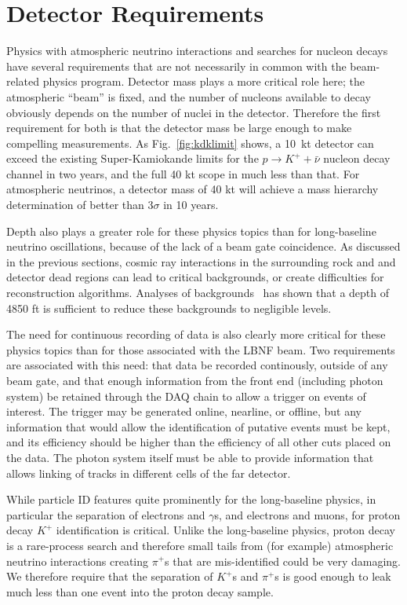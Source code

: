 \section{Detector Requirements}
\label{sec:physics-atmpdk-detector-requirements}

Physics with atmospheric neutrino interactions and searches for nucleon decays
have several requirements that are not necessarily in common with the
beam-related physics program.  Detector mass plays a more critical role here;
the atmospheric ``beam'' is fixed, and the number of nucleons available to
decay obviously depends on the number of nuclei in the detector.  Therefore the
first requirement for both is that the detector mass be large enough to make
compelling measurements. As Fig.~\ref{fig:kdklimit} shows, a 10~kt detector can
exceed the existing Super-Kamiokande limits for the $p\rightarrow K^+ +
\bar{\nu}$ nucleon decay channel in two years, and the full 40 kt scope in much
less than that.  For atmospheric neutrinos, a detector mass of 40 kt will
achieve a mass hierarchy determination of better than 3$\sigma$ in 10 years.

Depth also plays a greater role for these physics topics than for long-baseline
neutrino oscillations, because of the lack of a beam gate coincidence. As
discussed in the previous sections, cosmic ray interactions in the surrounding
rock and and detector dead regions can lead to critical backgrounds, or create
difficulties for reconstruction algorithms. Analyses of
backgrounds~\cite{bueno, klinger, sciopp} has shown that a depth of 4850 ft is
sufficient to reduce these backgrounds to negligible levels.

The need for continuous recording of data is also clearly more critical for
these physics topics than for those associated with the LBNF beam.  Two
requirements are associated with this need: that data be recorded continously,
outside of any beam gate, and that enough information from the front end
(including photon system) be retained through the DAQ chain to allow a trigger
on events of interest. The trigger may be generated online, nearline, or
offline, but any information that would allow the identification of putative
events must be kept, and its efficiency should be higher than the efficiency of
all other cuts placed on the data.  The photon system itself must be able to
provide information that allows linking of tracks in different cells of the far
detector.

While particle ID features quite prominently for the long-baseline physics, in
particular the separation of electrons and $\gamma$s, and electrons and muons,
for proton decay $K^+$ identification is critical.  Unlike the long-baseline
physics, proton decay is a rare-process search and therefore small tails from
(for example) atmospheric neutrino interactions creating $\pi^+$s that are
mis-identified could be very damaging. We therefore require that the separation
of $K^+$s and $\pi^+$s is good enough to leak much less than one event into the
proton decay sample.

